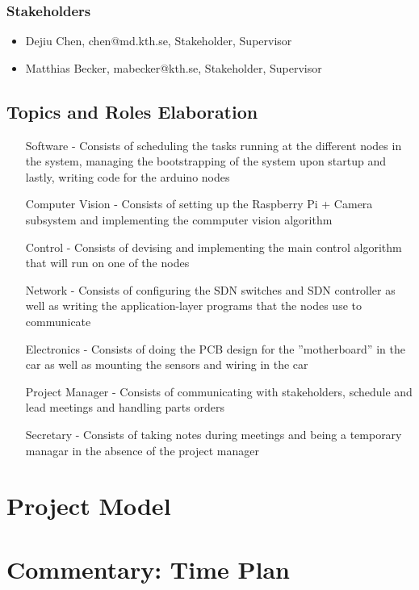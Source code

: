\documentclass[11pt, titlepage]{article} %
\begin{document}
\subsubsection{Stakeholders}
\begin{itemize}
    \item Dejiu Chen, chen@md.kth.se, Stakeholder, Supervisor
    \item Matthias Becker, mabecker@kth.se, Stakeholder, Supervisor
\end{itemize}


\subsection{Topics and Roles Elaboration}
\begin{itemize}
\item[Software] - Consists of scheduling the tasks running at the different
    nodes in the system, managing the bootstrapping of the system upon
    startup and lastly, writing code for the arduino nodes
\item[Computer Vision] - Consists of setting up the Raspberry Pi + Camera
    subsystem and implementing the commputer vision algorithm
\item[Control] - Consists of devising and implementing the main
    control algorithm that will run on one of the nodes
\item[Network] - Consists of configuring the SDN switches and SDN controller
    as well as writing the application-layer programs that the nodes
    use to communicate
\item[Electronics] - Consists of doing the PCB design for the
    ''motherboard'' in the car as well as mounting the sensors and 
    wiring in the car
\item[Project Manager] - Consists of communicating with stakeholders, 
    schedule and lead meetings and handling parts orders
\item[Secretary] - Consists of taking notes during meetings and
    being a temporary managar in the absence of the project manager
\end{itemize}

\section{Project Model}
\section{Commentary: Time Plan}
\end{document}

